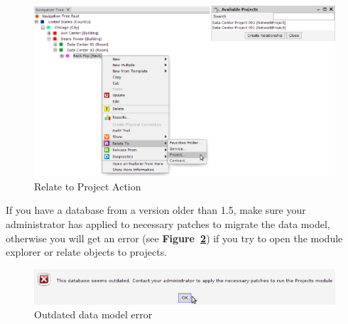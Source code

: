 \documentclass[a4paper]{article}
\begin{document}
		    \begin{figure}[h!]
		    	\centering
		    	\includegraphics[width=0.9\linewidth]{img/projects_relate_to.png}
		    	\caption{Relate to Project Action}
		    	\label{fig:projects_relate_to}
		    \end{figure}
		    
		    If you have a database from a version older than 1.5, make sure your administrator has applied to necessary patches to migrate the data model, otherwise you will get an error (see \textbf{Figure~\ref{fig:projects_db_outdated}}) if you try to open the module explorer or relate objects to projects.		    
		    \newpage 
		    \begin{figure}[h!]
		    	\centering
		    	\includegraphics[width=0.9\linewidth]{img/projects_db_outdated.png}
		    	\caption{Outdated data model error}
		    	\label{fig:projects_db_outdated}
		    \end{figure}
		    
\end{document}
